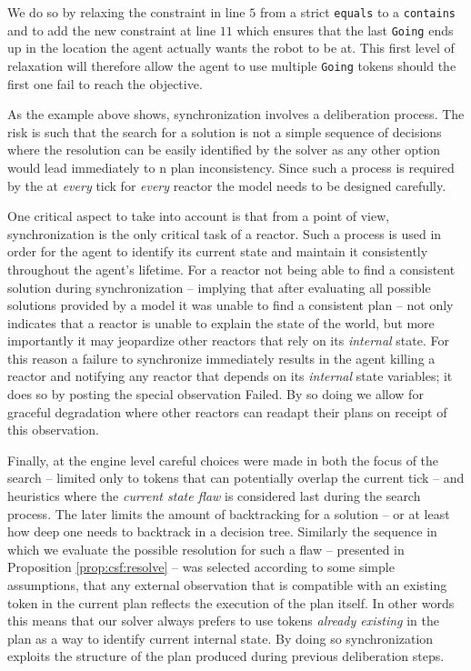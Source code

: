 We do so by relaxing the constraint in line $5$ from a strict
\texttt{equals} to a \texttt{contains} and to add the new constraint
at line $11$ which ensures that the last \texttt{Going} ends up in the
location the agent actually wants the robot to be at. This first level
of relaxation will therefore allow the agent to use multiple
\texttt{Going} tokens should the first one fail to reach the
objective.  

As the example above shows, synchronization involves a deliberation
process. The risk is such that the search for a solution is not a
simple sequence of decisions where the resolution can be easily
identified by the solver as any other option would lead immediately to
n plan inconsistency. Since such a process is required by the \rx at
\emph{every} tick for \emph{every} reactor the model needs to be
designed carefully.

One critical aspect to take into account is that from a \rx point of
view, synchronization is the only critical task of a reactor. Such a
process is used in order for the agent to identify its current state
and maintain it consistently throughout the agent's lifetime. For a
reactor not being able to find a consistent solution during
synchronization -- implying that after evaluating all possible
solutions provided by a model it was unable to find a consistent plan
-- not only indicates that a reactor is unable to explain the state of
the world, but more importantly it may jeopardize other reactors that
rely on its {\em internal} state. For this reason a failure to
synchronize immediately results in the \rx agent killing a reactor and
notifying any reactor that depends on its {\em internal} state
variables; it does so by posting the special observation
\textsf{Failed}. By so doing we allow for graceful degradation where
other reactors can readapt their plans on receipt of this observation.

Finally, at the engine level careful choices were made in both the
focus of the search -- limited only to tokens that can potentially
overlap the current tick -- and heuristics where the {\em current
  state flaw} is considered last during the search process. The later
limits the amount of backtracking for a solution -- or at least how
deep one needs to backtrack in a decision tree.  Similarly the
sequence in which we evaluate the possible resolution for such a flaw
-- presented in Proposition \ref{prop:csf:resolve} -- was selected
according to some simple assumptions, that any external observation
that is compatible with an existing token in the current plan reflects
the execution of the plan itself. In other words this means that our
solver always prefers to use tokens \emph{already existing} in the
plan as a way to identify current internal state. By doing so
synchronization exploits the structure of the plan produced during
previous deliberation steps.

